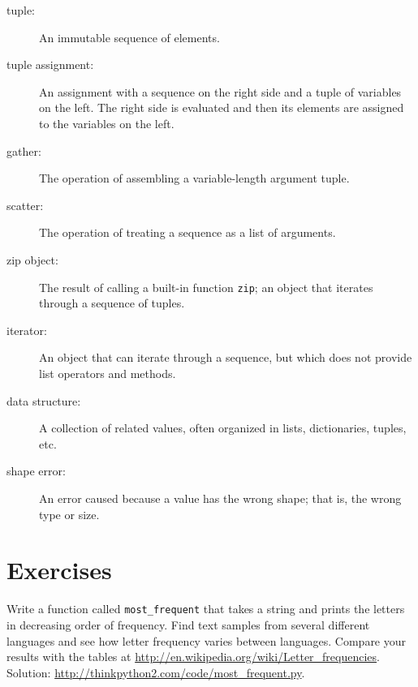 \documentclass[10pt]{book}
\begin{document}
\begin{description}

\item[tuple:] An immutable sequence of elements.

\item[tuple assignment:] An assignment with a sequence on the
right side and a tuple of variables on the left.  The right
side is evaluated and then its elements are assigned to the
variables on the left.

\item[gather:] The operation of assembling a variable-length
argument tuple.

\item[scatter:] The operation of treating a sequence as a list of
arguments.

\item[zip object:] The result of calling a built-in function {\tt zip};
an object that iterates through a sequence of tuples.

\item[iterator:] An object that can iterate through a sequence, but
which does not provide list operators and methods.

\item[data structure:] A collection of related values, often
organized in lists, dictionaries, tuples, etc.

\item[shape error:] An error caused because a value has the
wrong shape; that is, the wrong type or size.

\end{description}


\section{Exercises}

\begin{exercise}

Write a function called \verb"most_frequent" that takes a string and
prints the letters in decreasing order of frequency.  Find text
samples from several different languages and see how letter frequency
varies between languages.  Compare your results with the tables at
\url{http://en.wikipedia.org/wiki/Letter_frequencies}.  Solution:
\url{http://thinkpython2.com/code/most_frequent.py}.   

\end{exercise}
\end{document}
